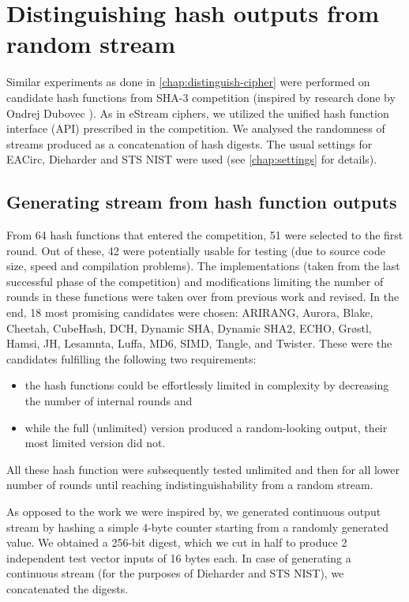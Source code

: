 \documentclass[12pt,twoside]{fithesis2}		%
\renewcommand{\_}{\leavevmode \kern0.0em\vbox{\hrule width0.4em}}
\newcommand{\squarebullet}{\textcolor{black}{\raisebox{0.15em}{\rule{4pt}{4pt}}}}
\newenvironment{myItemize}{
  \begin{itemize}[leftmargin=2em,rightmargin=1em,itemsep=\parskip ,parsep=0em,topsep=0em,partopsep=0em]
  \renewcommand{\labelitemi}{\squarebullet}
  \renewcommand{\labelitemii}{$\diamond$}
}{
  \end{itemize}
}
\begin{document}
\chapter{Distinguishing hash outputs from random stream}
\label{chap:distinguish-hash}

Similar experiments as done in \autoref{chap:distinguish-cipher} were performed on candidate hash functions from SHA-3 competition
\parencite{sha3-competition}
(inspired by research done by Ondrej Dubovec \parencite{thesis-dubovec}).
As in eStream ciphers, we utilized the unified hash function interface (API) prescribed in the competition.
We analysed the randomness of streams produced as a concatenation of hash digests.
The usual settings for EACirc, Dieharder and STS NIST were used (see \autoref{chap:settings} for details).

\section{Generating stream from hash function outputs}
\label{sec:hash-settings}

From 64 hash functions that entered the competition, 51 were selected to the first round. 
Out of these, 42 were potentially usable for testing (due to source code size, speed and compilation problems).
The implementations (taken from the last successful phase of the competition) and
modifications limiting the number of rounds in these functions were taken over from previous work \parencite{thesis-dubovec}
and revised. In the end, 18 most promising candidates were chosen: ARIRANG, Aurora, Blake, Cheetah, CubeHash, DCH, 
Dynamic SHA, Dynamic SHA2, ECHO, Grøstl, Hamsi, JH, Lesamnta, Luffa, MD6, SIMD, Tangle, and Twister.
These were the candidates fulfilling the following two requirements:
\begin{myItemize}
\item the hash functions could be effortlessly limited in complexity by decreasing the number of internal rounds and
\item while the full (unlimited) version produced a random-looking output, their most limited version did not.
\end{myItemize}
\noindent
All these hash function were subsequently tested unlimited and
then for all lower number of rounds until reaching indistinguishability from a random stream.

As opposed to the work we were inspired by, we generated continuous output stream by hashing a simple 4-byte counter starting
from a randomly generated value. We obtained a 256-bit digest, which we cut in half to produce 2 independent test vector inputs
of 16 bytes each. In case of generating a continuous stream (for the purposes of Dieharder and STS NIST), we concatenated 
the digests.
\end{document}
